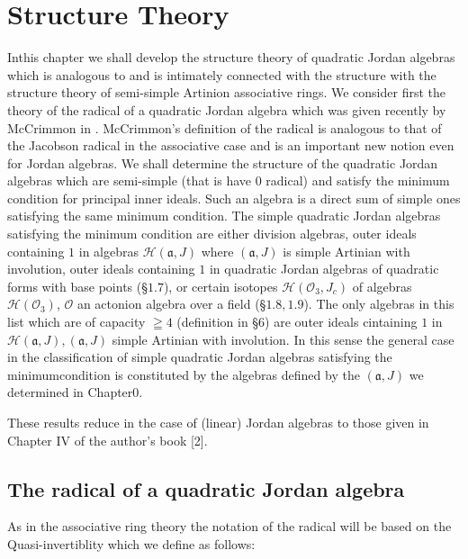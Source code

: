 
\chapter{Structure Theory}\label{c3}

In\pageoriginale this chapter we shall develop the structure theory of quadratic
Jordan algebras which is analogous to and is intimately connected with
the structure with the structure theory of semi-simple Artinion
associative rings. We consider first the theory of the radical of  a
quadratic Jordan algebra which was given recently by McCrimmon in
\cite{McCrimmon1}. McCrimmon's definition of the radical is analogous to that
of the Jacobson radical in the associative case and is an important
new notion even for Jordan algebras. We shall determine the structure
of the quadratic Jordan algebras which are semi-simple (that is have
$0$ radical) and satisfy the minimum condition for principal inner
ideals. Such an algebra is a direct sum of simple ones satisfying the
same minimum condition. The simple quadratic Jordan algebras
satisfying the minimum condition are either division algebras, outer
ideals containing $1$ in algebras $\mathscr{H}(\mathfrak{a},J)$ where
$(\mathfrak{a},J)$ is simple Artinian with involution, outer ideals
containing $1$ in quadratic Jordan algebras of quadratic forms with
base points (\S $1.7$), or certain isotopes
$\mathscr{H}(\mathscr{O}_3,J_c)$ of algebras
$\mathscr{H}(\mathscr{O}_3)$, $\mathscr{O}$ an actonion algebra over a
field (\S $1.8, 1.9$). The only algebras in this list which are of
capacity $\geqq 4$ (definition in \S 6) are outer ideals cintaining
$1$ in $\mathscr{H}(\mathfrak{a},J),(\mathfrak{a},J)$ simple Artinian
with involution. In this sense the general case in the classification
of simple quadratic Jordan algebras satisfying the
minimum\pageoriginale condition is constituted by the algebras defined
by the $(\mathfrak{a},J)$ we determined in Chapter$0$.

\newpage

These results reduce in the case of (linear) Jordan algebras to those
given in Chapter IV of the author's book [2].

\section{The radical of a quadratic Jordan algebra}\label{c3:sec1}

As in the associative ring theory the notation of the radical will be
based on the Quasi-invertiblity which we define as follows:

